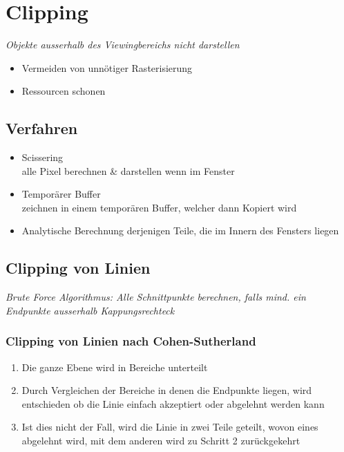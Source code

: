 \section{Clipping}

\textit{Objekte ausserhalb des Viewingbereichs nicht darstellen}

\begin{itemize}
    \item Vermeiden von unnötiger Rasterisierung
    \item Ressourcen schonen
\end{itemize}

\subsection{Verfahren}
\begin{itemize}
    \item Scissering \\
    alle Pixel berechnen \& darstellen wenn im Fenster

    \item Temporärer Buffer \\
    zeichnen in einem temporären Buffer, welcher dann Kopiert wird

    \item Analytische Berechnung derjenigen Teile, die im Innern des Fensters liegen

\end{itemize}

\subsection{Clipping von Linien}

\textit{Brute Force Algorithmus: Alle Schnittpunkte berechnen, falls mind. ein Endpunkte ausserhalb Kappungsrechteck}

\subsubsection{Clipping von Linien nach Cohen-Sutherland}


\begin{enumerate}
    \item Die ganze Ebene wird in Bereiche unterteilt
    \item Durch Vergleichen der Bereiche in denen die Endpunkte liegen, wird entschieden ob die Linie einfach akzeptiert oder abgelehnt werden kann
    \item Ist dies nicht der Fall, wird die Linie in zwei Teile geteilt, wovon eines abgelehnt wird, mit dem anderen wird zu Schritt 2 zurückgekehrt
\end{enumerate}

